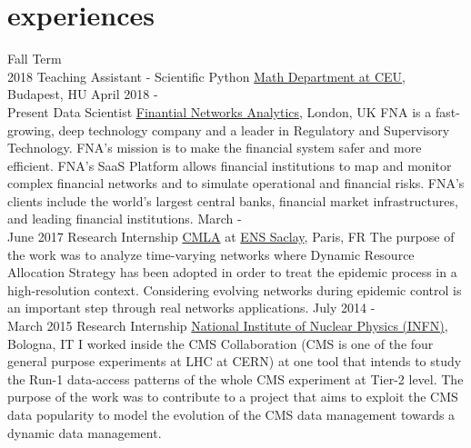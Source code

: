 \documentclass[]{cv-style}     %
\begin{document}
\section{experiences}
\begin{entrylist}
\entry
{Fall Term\\2018}
{Teaching Assistant - Scientific Python}
{\href{http://www.ceu.edu}{Math Department at CEU}, Budapest, HU}
{}
\entry
{April 2018 - \\Present}
{Data Scientist}
{\href{http://www.fna.fi}{Finantial Networks Analytics}, London, UK}
{FNA is a fast-growing, deep technology company and a leader in Regulatory and Supervisory
Technology. FNA's mission is to make the financial system safer and more efficient. FNA's SaaS Platform allows financial institutions to map and monitor complex financial networks and to simulate operational and financial risks. FNA’s clients include the world’s largest central banks, financial market infrastructures, and leading financial institutions.}
\entry
{March -\\June 2017}
{Research Internship}
{\href{http://www.cmla.ens-cachan.fr/}{CMLA} at \href{http://www.ens-cachan.fr/}{ENS Saclay}, Paris, FR}
{The purpose of the work was to analyze time-varying networks where Dynamic Resource Allocation Strategy has been adopted in order to treat the epidemic process in a high-resolution context. Considering evolving networks during epidemic control is an important step through real networks applications.}
\entry
{July 2014 -\\March 2015}
{Research Internship}
{\href{http://home.infn.it/it/}{National Institute of Nuclear Physics (INFN)}, Bologna, IT}
{
I worked inside the CMS Collaboration (CMS is one of the four general purpose
    experiments at LHC at CERN) at one tool that intends to study the Run-1
    data-access patterns of the whole CMS experiment at Tier-2 level.
    The purpose of the work was to contribute to a project that aims to
    exploit the CMS data popularity to model the evolution of the CMS
data management towards a dynamic data management.
}
\end{entrylist}
\end{document}
